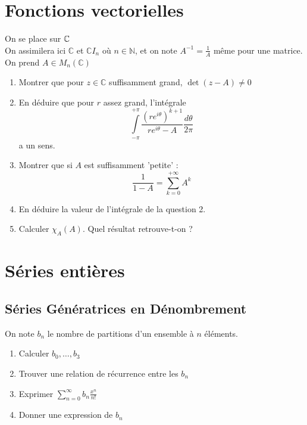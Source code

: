 \documentclass[12pt,a4paper]{exo_book}
\begin{document}
\chapter{Fonctions vectorielles}

\begin{exo}
    On se place sur $\mathbb{C}$\\
    On assimilera ici $\mathbb{C}$ et $\mathbb{C}I_{n}$ où $n \in \mathbb{N}$, et on note $A^{-1} = \frac{1}{A}$ même pour une matrice.\\
    On prend $A \in M_{n}(\mathbb{C})$
    \begin{enumerate}
        \item Montrer que pour $z \in \mathbb{C}$ suffisamment grand, $\det(z - A) \neq 0 $
        \item En déduire que pour $r$ assez grand, l'intégrale \[\int\limits_{-\pi}^{+\pi}\frac{(re^{i\theta})^{k+1}}{re^{i\theta} - A}\frac{d\theta}{2\pi}\] a un sens. 
        \item Montrer que si $A$ est suffisamment 'petite' : \[\frac{1}{1-A} = \sum_{k=0}^{+\infty} A^{k} \]
        \item En déduire la valeur de l'intégrale de la question 2.
        \item Calculer $\chi_{A}(A)$. Quel résultat retrouve-t-on ?
    \end{enumerate}
\end{exo}


\chapter{Séries entières}

\section{Séries Génératrices en Dénombrement}

\begin{exo}
    On note $b_{n}$ le nombre de partitions d'un ensemble à $n$ éléments.
    \begin{enumerate}
        \item Calculer $b_{0}, \dots, b_{3}$
        \item Trouver une relation de récurrence entre les $b_{n}$
        \item Exprimer $\sum\limits_{n=0}^{\infty}b_{n}\frac{x^{n}}{n!}$
        \item Donner une expression de $b_{n}$
    \end{enumerate}
\end{exo}
\end{document}
